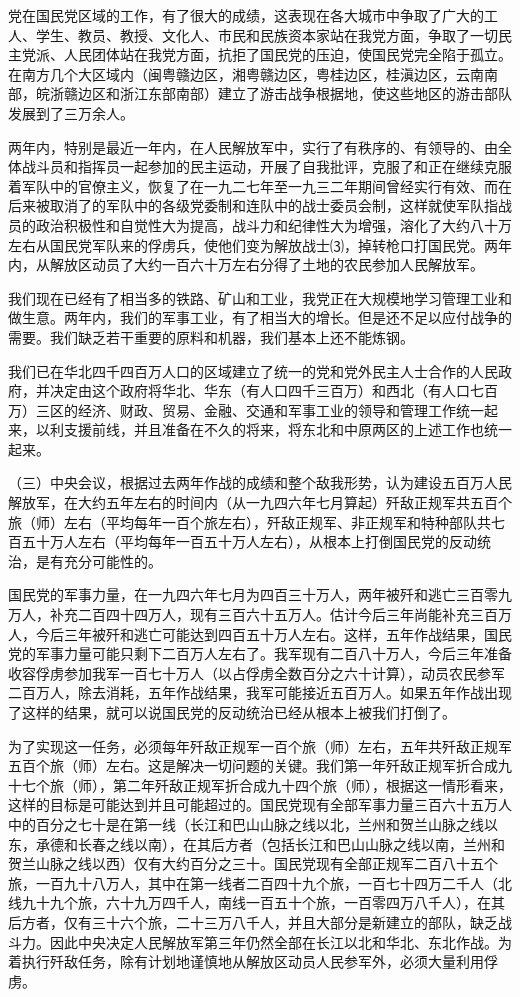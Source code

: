 \documentclass[UTF-8, a5paper, 12pt]{ctexart}
\begin{document}
党在国民党区域的工作，有了很大的成绩，这表现在各大城市中争取了广大的工人、学生、教员、教授、文化人、市民和民族资本家站在我党方面，争取了一切民主党派、人民团体站在我党方面，抗拒了国民党的压迫，使国民党完全陷于孤立。在南方几个大区域内（闽粤赣边区，湘粤赣边区，粤桂边区，桂滇边区，云南南部，皖浙赣边区和浙江东部南部）建立了游击战争根据地，使这些地区的游击部队发展到了三万余人。

两年内，特别是最近一年内，在人民解放军中，实行了有秩序的、有领导的、由全体战斗员和指挥员一起参加的民主运动，开展了自我批评，克服了和正在继续克服着军队中的官僚主义，恢复了在一九二七年至一九三二年期间曾经实行有效、而在后来被取消了的军队中的各级党委制和连队中的战士委员会制，这样就使军队指战员的政治积极性和自觉性大为提高，战斗力和纪律性大为增强，溶化了大约八十万左右从国民党军队来的俘虏兵，使他们变为解放战士⑶，掉转枪口打国民党。两年内，从解放区动员了大约一百六十万左右分得了土地的农民参加人民解放军。

我们现在已经有了相当多的铁路、矿山和工业，我党正在大规模地学习管理工业和做生意。两年内，我们的军事工业，有了相当大的增长。但是还不足以应付战争的需要。我们缺乏若干重要的原料和机器，我们基本上还不能炼钢。

我们已在华北四千四百万人口的区域建立了统一的党和党外民主人士合作的人民政府，并决定由这个政府将华北、华东（有人口四千三百万）和西北（有人口七百万）三区的经济、财政、贸易、金融、交通和军事工业的领导和管理工作统一起来，以利支援前线，并且准备在不久的将来，将东北和中原两区的上述工作也统一起来。

（三）中央会议，根据过去两年作战的成绩和整个敌我形势，认为建设五百万人民解放军，在大约五年左右的时间内（从一九四六年七月算起）歼敌正规军共五百个旅（师）左右（平均每年一百个旅左右），歼敌正规军、非正规军和特种部队共七百五十万人左右（平均每年一百五十万人左右），从根本上打倒国民党的反动统治，是有充分可能性的。

国民党的军事力量，在一九四六年七月为四百三十万人，两年被歼和逃亡三百零九万人，补充二百四十四万人，现有三百六十五万人。估计今后三年尚能补充三百万人，今后三年被歼和逃亡可能达到四百五十万人左右。这样，五年作战结果，国民党的军事力量可能只剩下二百万人左右了。我军现有二百八十万人，今后三年准备收容俘虏参加我军一百七十万人（以占俘虏全数百分之六十计算），动员农民参军二百万人，除去消耗，五年作战结果，我军可能接近五百万人。如果五年作战出现了这样的结果，就可以说国民党的反动统治已经从根本上被我们打倒了。

为了实现这一任务，必须每年歼敌正规军一百个旅（师）左右，五年共歼敌正规军五百个旅（师）左右。这是解决一切问题的关键。我们第一年歼敌正规军折合成九十七个旅（师），第二年歼敌正规军折合成九十四个旅（师），根据这一情形看来，这样的目标是可能达到并且可能超过的。国民党现有全部军事力量三百六十五万人中的百分之七十是在第一线（长江和巴山山脉之线以北，兰州和贺兰山脉之线以东，承德和长春之线以南），在其后方者（包括长江和巴山山脉之线以南，兰州和贺兰山脉之线以西）仅有大约百分之三十。国民党现有全部正规军二百八十五个旅，一百九十八万人，其中在第一线者二百四十九个旅，一百七十四万二千人（北线九十九个旅，六十九万四千人，南线一百五十个旅，一百零四万八千人），在其后方者，仅有三十六个旅，二十三万八千人，并且大部分是新建立的部队，缺乏战斗力。因此中央决定人民解放军第三年仍然全部在长江以北和华北、东北作战。为着执行歼敌任务，除有计划地谨慎地从解放区动员人民参军外，必须大量利用俘虏。
\end{document}
